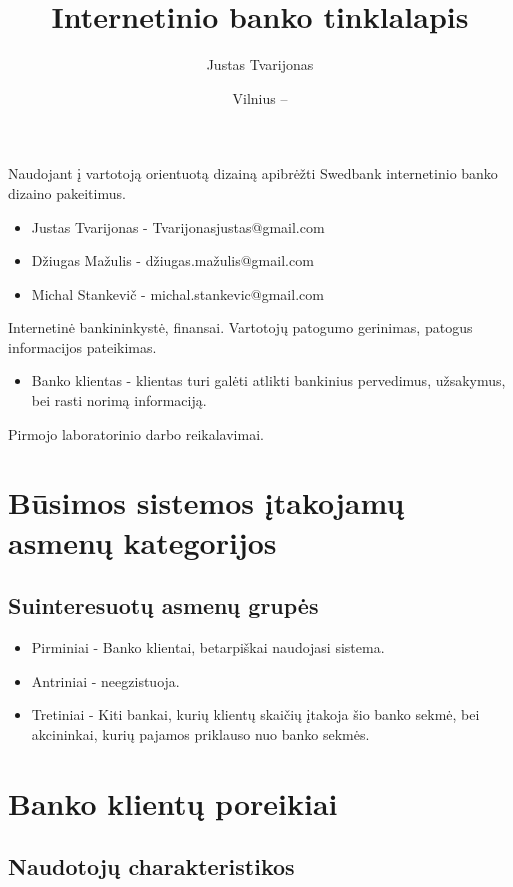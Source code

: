 \documentclass{VUMIFPSkursinis}
\title{Internetinio banko tinklalapis}
\author{Justas Tvarijonas}
\date{Vilnius – \the\year}
\begin{document}
\maketitle

\tableofcontents
{}
Naudojant į vartotoją orientuotą dizainą apibrėžti Swedbank internetinio banko dizaino pakeitimus.
\begin{itemize}
	\item Justas Tvarijonas - Tvarijonasjustas@gmail.com
	\item Džiugas Mažulis - džiugas.mažulis@gmail.com
	\item Michal Stankevič - michal.stankevic@gmail.com
\end{itemize}
Internetinė bankininkystė, finansai.
Vartotojų patogumo gerinimas, patogus informacijos pateikimas.
\begin{itemize}
	\item Banko klientas - klientas turi galėti atlikti bankinius pervedimus, užsakymus, bei rasti norimą informaciją.
\end{itemize}
Pirmojo laboratorinio darbo reikalavimai.
\section{Būsimos sistemos įtakojamų asmenų kategorijos}
\subsection{Suinteresuotų asmenų grupės}
\begin{itemize}
	\item Pirminiai - Banko klientai, betarpiškai naudojasi sistema.
	\item Antriniai - neegzistuoja.
	\item Tretiniai - Kiti bankai, kurių klientų skaičių įtakoja šio banko sekmė, bei akcininkai, kurių pajamos priklauso nuo banko sekmės.
\end{itemize}
\section{Banko klientų poreikiai}
\subsection{Naudotojų charakteristikos}
\end{document}
